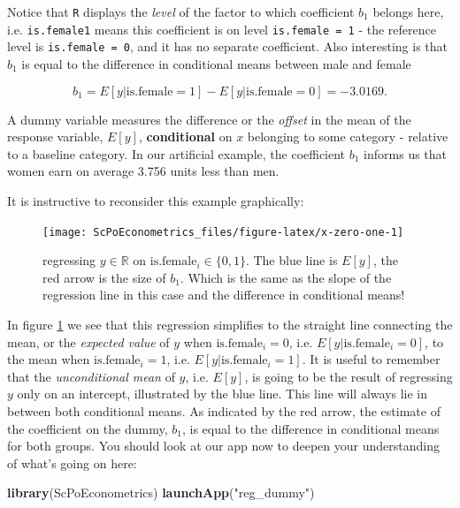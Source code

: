 \documentclass[]{book}
\newenvironment{Shaded}{\begin{snugshade}}{\end{snugshade}}
\newcommand{\KeywordTok}[1]{\textcolor[rgb]{0.13,0.29,0.53}{\textbf{#1}}}
\newcommand{\StringTok}[1]{\textcolor[rgb]{0.31,0.60,0.02}{#1}}
\newcommand{\NormalTok}[1]{#1}
\newenvironment{note}{\begin{tcolorbox}[colback=blue!5!white,colframe=blue!75!black]}{\end{tcolorbox}}
\begin{document}
Notice that \texttt{R} displays the \emph{level} of the factor to which
coefficient \(b_1\) belongs here, i.e. \texttt{is.female1} means this
coefficient is on level \texttt{is.female\ =\ 1} - the reference level
is \texttt{is.female\ =\ 0}, and it has no separate coefficient. Also
interesting is that \(b_1\) is equal to the difference in conditional
means between male and female

\[b_1 = E[y|\text{is.female}=1] - E[y|\text{is.female}=0]=-3.0169.\]

\begin{note}
A dummy variable measures the difference or the \emph{offset} in the
mean of the response variable, \(E[y]\), \textbf{conditional} on \(x\)
belonging to some category - relative to a baseline category. In our
artificial example, the coefficient \(b_1\) informs us that women earn
on average 3.756 units less than men.
\end{note}

It is instructive to reconsider this example graphically:

\begin{figure}

{\centering \texttt{[image: ScPoEconometrics\_files/figure-latex/x-zero-one-1]} 

}

\caption{regressing $y \in \mathbb{R}$ on $\text{is.female}_i \in \{0,1\}$. The blue line is $E[y]$, the red arrow is the size of $b_1$. Which is the same as the slope of the regression line in this case and the difference in conditional means!}\label{fig:x-zero-one}
\end{figure}

In figure \ref{fig:x-zero-one} we see that this regression simplifies to
the straight line connecting the mean, or the \emph{expected value} of
\(y\) when \(\text{is.female}_i = 0\), i.e.
\(E[y|\text{is.female}_i=0]\), to the mean when
\(\text{is.female}_i=1\), i.e. \(E[y|\text{is.female}_i=1]\). It is
useful to remember that the \emph{unconditional mean} of \(y\), i.e.
\(E[y]\), is going to be the result of regressing \(y\) only on an
intercept, illustrated by the blue line. This line will always lie in
between both conditional means. As indicated by the red arrow, the
estimate of the coefficient on the dummy, \(b_1\), is equal to the
difference in conditional means for both groups. You should look at our
app now to deepen your understanding of what's going on here:

\begin{Shaded}
\begin{Highlighting}[]
\KeywordTok{library}\NormalTok{(ScPoEconometrics)}
\KeywordTok{launchApp}\NormalTok{(}\StringTok{"reg_dummy"}\NormalTok{)}
\end{Highlighting}
\end{Shaded}
\end{document}
